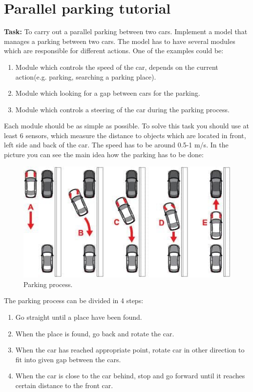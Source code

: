 \section{Parallel parking tutorial}
\textbf{Task:} To carry out a parallel parking between two cars. \newline
Implement a model that manages a parking between two cars. The model has to have several modules which are responsible for different actions. One of the examples could be:
\begin{enumerate}
    \item Module which controls the speed of the car, depends on the current action(e.g. parking, searching a parking place).
    \item Module which looking for a gap between cars for the parking.
    \item Module which controls a steering of the car during the parking process.
\end{enumerate}
Each module should be as simple as possible. \newline
To solve this task you should use at least 6 sensors, which measure the distance to objects which are located in front, left side and back of the car. The speed has to be around 0.5-1 m/s. In the picture you can see the main idea how the parking has to be done:
\begin{figure}[h!]
    \centering
    \includegraphics[width=0.8\linewidth]{src/pic/parking_process1}
    \caption{Parking process.}
    \label{fig:parking}
\end{figure}
The parking process can be divided in 4 steps:
\begin{enumerate}
    \item Go straight until a place have been found.
    \item When the place is found, go back and rotate the car.
    \item When the car has reached appropriate point, rotate car in other direction to fit into given gap between the cars.
    \item When the car is close to the car behind, stop and go forward until it reaches certain distance to the front car.
\end{enumerate}
